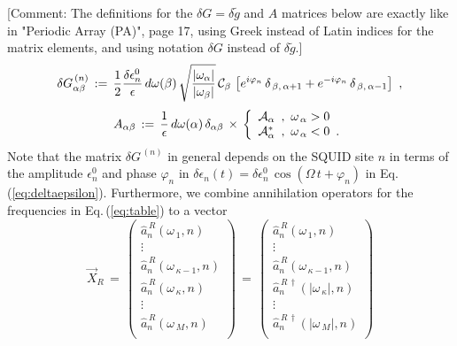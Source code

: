 \noindent
\color{red}
[Comment: The definitions for the $\delta G = \delta \widetilde{g}$ and $A$ matrices below are exactly 
like in "Periodic Array (PA)", page 17, using Greek instead of Latin indices for the matrix elements,
and using notation $\delta G$ instead of $\delta \widetilde{g}$.]
\color{black}
%
\begin{equation} \label{eq:matrix_gtilde}
\delta G_{\alpha \beta}^{\,(n)} \, := \, \frac{1}{2} \frac{\delta \epsilon_n^0}{\epsilon} \, 
d\omega(\beta) \,
\sqrt{\frac{|\omega_{\alpha}|}{|\omega_{\beta}|}} \, {\cal C}_{\beta} \,
\left[e^{i \varphi_n} \, \delta_{\,\beta,\,\alpha+1} + e^{- i \varphi_n} \, \delta_{\,\beta,\,\alpha-1} \right] \, \, ,
\end{equation}
%
\begin{equation} \label{eq:matrix_a}
A_{\alpha \beta} \, := \, \frac{1}{\epsilon} \, d\omega(\alpha) \, \delta_{\alpha \beta} \, \times \,
\left\{
\begin{array}{l}
{\cal{A}}_{\alpha} \, \, \, , \, \, \omega_{\,\alpha}>0  \\
{\cal{A}}_{\alpha}^* \, \, \, , \, \, \omega_{\,\alpha}<0 \, \, \, .
\end{array} \right.
\end{equation}
%
Note that the matrix $\delta G^{\,(n)}$ in general depends on the SQUID site $n$ in terms
of the amplitude $\epsilon_n^0$ and phase $\varphi_n$ in 
$\delta \epsilon_n(t) = \delta \epsilon_n^0 \, \cos(\Omega \, t + \varphi_n)$
in Eq.\,(\ref{eq:deltaepsilon}).
%
Furthermore, we combine annihilation operators for the frequencies in Eq.\,(\ref{eq:table}) to a vector
%
\begin{equation} \label{eq:vector_x}
\vec{X}_R \, = \, 
\begin{pmatrix}
\hat{a}_n^{\,R}(\omega_{\,1},n) \\
\vdots \\
\hat{a}_n^{\,R}(\omega_{\,\kappa-1},n) \\
\hat{a}_n^{\,R}(\omega_{\,\kappa},n) \\
\vdots \\
\hat{a}_n^{\,R}(\omega_{\,M},n) \\
\end{pmatrix}
\, = \,
\begin{pmatrix}
\hat{a}_n^{\,R}(\omega_{\,1},n) \\
\vdots \\
\hat{a}_n^{\,R}(\omega_{\,\kappa-1},n) \\
\hat{a}_n^{\,R\,\dagger}(|\omega_{\,\kappa}|,n) \\
\vdots \\
\hat{a}_n^{\,R\,\dagger}(|\omega_{\,M}|,n) \\
\end{pmatrix}
\end{equation}
